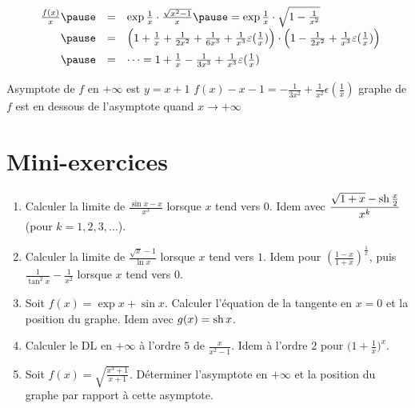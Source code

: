 \begin{frame}
\begin{exemple}[Asymptote de  $f(x)=\exp{\frac1x} \cdot \sqrt{x^2-1}$ en $+\infty$]
\pause
{}
\pause
\vspace*{-5mm}
$$
\begin{array}{rcl@{\vrule depth 1.2ex height 3ex width 0mm }}
\frac{f(x)}{x} \pause
  & = & \exp{\frac1x} \cdot\frac{\sqrt{x^2-1}}{x} \pause =\exp{\frac1x} \cdot\sqrt{1-\frac{1}{x^2}} \\ \pause
  & = & \Big(1+\frac{1}{x}+\frac{1}{2x^2}+\frac{1}{6x^3} +\frac{1}{x^3}\epsilon(\frac1x)\Big) 
\cdot\Big(1-\frac{1}{2x^2}+\frac{1}{x^3}\epsilon(\frac{1}{x})\Big) \\ \pause
  & = & \cdots = 1+\frac{1}{x}-\frac{1}{3x^3} +\frac{1}{x^3}\epsilon(\frac{1}{x}) \\
\end{array}$$

\pause 

Asymptote de $f$ en $+\infty$ est $y=x+1$ \pause\pause \hfill $f(x)-x-1=-\frac{1}{3x^2}+\frac{1}{x^2}\epsilon(\frac{1}{x})$
\pause
graphe de $f$ est en dessous de l'asymptote quand $x\to+\infty$
\end{exemple}

\end{frame}

\section{Mini-exercices}

\begin{frame}

\begin{miniexercice}
\begin{enumerate}
  \item Calculer la limite de $\displaystyle \frac{\sin x - x}{x^3}$ lorsque $x$ tend vers $0$. 
Idem avec $\displaystyle \frac{\sqrt{1+x}-\mathop{\text{sh}}\nolimits \frac x2}{x^k}$ (pour $k=1,2,3,\ldots$).
  \item Calculer la limite de $\displaystyle \frac{\sqrt x - 1}{\ln x}$ lorsque $x$ tend vers $1$. 
Idem pour $\displaystyle \left(\frac{1-x}{1+x}\right)^{\frac{1}{x}}$, 
puis $\displaystyle \frac{1}{\tan^2 x}-\frac{1}{x^2}$ lorsque $x$ tend vers $0$.
  \item Soit $f(x)=\exp x + \sin x$. Calculer l'équation de la tangente en $x=0$ et la position du graphe.
Idem avec $g(x)= \mathop{\text{sh}}\nolimits x$.
  \item Calculer le DL en $+\infty$ à l'ordre $5$ de $\frac{x}{x^2-1}$. Idem à l'ordre $2$ pour
$\big(1+\frac 1x\big)^{x}$.
  \item Soit $f(x)=\sqrt{\frac{x^3+1}{x+1}}$. Déterminer l'asymptote en $+\infty$ et la position du graphe
par rapport à cette asymptote.
\end{enumerate}
\end{miniexercice}
\end{frame}

